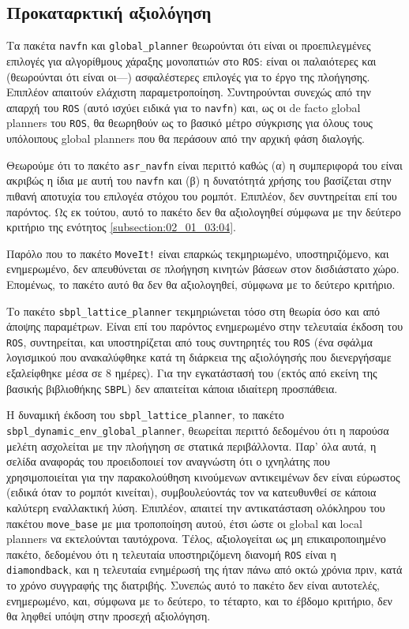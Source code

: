 \subsection{Προκαταρκτική αξιολόγηση}
  \label{subsection:02_01_04:01}

Τα πακέτα \texttt{navfn} και \texttt{global\_planner} θεωρούνται ότι είναι οι
προεπιλεγμένες επιλογές για αλγορίθμους χάραξης μονοπατιών στο \texttt{ROS}:
είναι οι παλαιότερες και (θεωρούνται ότι είναι οι---) ασφαλέστερες επιλογές για
το έργο της πλοήγησης. Επιπλέον απαιτούν ελάχιστη παραμετροποίηση.
Συντηρούνται συνεχώς από την απαρχή του \texttt{ROS} (αυτό ισχύει ειδικά για το
\texttt{navfn}) και, ως οι de facto global planners του \texttt{ROS}, θα
θεωρηθούν ως το βασικό μέτρο σύγκρισης για όλους τους υπόλοιπους global planners
που θα περάσουν από την αρχική φάση διαλογής.

Θεωρούμε ότι το πακέτο \texttt{asr\_navfn} είναι περιττό καθώς (α) η
συμπεριφορά του είναι ακριβώς η ίδια με αυτή του \texttt{navfn} και (β) η
δυνατότητά χρήσης του βασίζεται στην πιθανή αποτυχία του επιλογέα στόχου του
ρομπότ. Επιπλέον, δεν συντηρείται επί του παρόντος. Ως εκ τούτου, αυτό το
πακέτο δεν θα αξιολογηθεί σύμφωνα με την δεύτερο κριτήριο της ενότητος
\ref{subsection:02_01_03:04}.

Παρόλο που το πακέτο \texttt{MoveIt!} είναι επαρκώς τεκμηριωμένο,
υποστηριζόμενο, και ενημερωμένο, δεν απευθύνεται σε πλοήγηση κινητών βάσεων
στον δισδιάστατο χώρο. Επομένως, το πακέτο αυτό θα δεν θα αξιολογηθεί, σύμφωνα
με το δεύτερο κριτήριο.

Το πακέτο \texttt{sbpl\_lattice\_planner} τεκμηριώνεται τόσο στη θεωρία όσο και
από άποψης παραμέτρων. Είναι επί του παρόντος ενημερωμένο στην τελευταία έκδοση
του \texttt{ROS}, συντηρείται, και υποστηρίζεται από τους συντηρητές του
\texttt{ROS} (ένα σφάλμα λογισμικού που ανακαλύφθηκε κατά τη διάρκεια της
αξιολόγησής που διενεργήσαμε εξαλείφθηκε μέσα σε $8$ ημέρες). Για την
εγκατάστασή του (εκτός από εκείνη της βασικής βιβλιοθήκης \texttt{SBPL}) δεν
απαιτείται κάποια ιδιαίτερη προσπάθεια.

Η δυναμική έκδοση του \texttt{sbpl\_lattice\_planner}, το πακέτο
\texttt{sbpl\_dynamic\_env\_global\_planner}, θεωρείται περιττό δεδομένου ότι η
παρούσα μελέτη ασχολείται με την πλοήγηση σε στατικά περιβάλλοντα.  Παρ' όλα
αυτά, η σελίδα αναφοράς του προειδοποιεί τον αναγνώστη ότι ο ιχνηλάτης που
χρησιμοποιείται για την παρακολούθηση κινούμενων αντικειμένων δεν είναι
εύρωστος (ειδικά όταν το ρομπότ κινείται), συμβουλεύοντάς τον να κατευθυνθεί σε
κάποια καλύτερη εναλλακτική λύση. Επιπλέον, απαιτεί την αντικατάσταση ολόκληρου
του πακέτου \texttt{move\_base} με μια τροποποίηση αυτού, έτσι ώστε οι global
και local planners να εκτελούνται ταυτόχρονα. Τέλος, αξιολογείται ως μη
επικαιροποιημένο πακέτο, δεδομένου ότι η τελευταία υποστηριζόμενη διανομή
\texttt{ROS} είναι η \texttt{diamondback}, και η τελευταία ενημέρωσή της ήταν
πάνω από οκτώ χρόνια πριν, κατά το χρόνο συγγραφής της διατριβής. Συνεπώς αυτό
το πακέτο δεν είναι αυτοτελές, ενημερωμένο, και, σύμφωνα με τo δεύτερο, το
τέταρτο, και το έβδομο κριτήριο, δεν θα ληφθεί υπόψη στην προσεχή αξιολόγηση.

